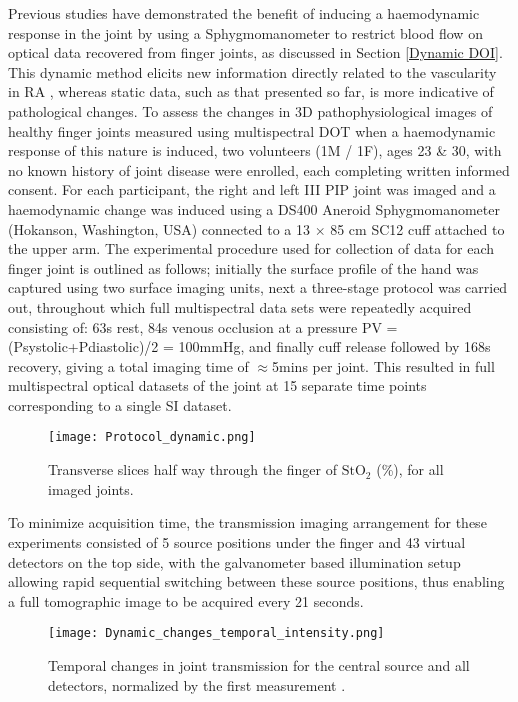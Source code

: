 \documentclass[twoside]{bhamthesis}
\theoremstyle{definition}
\begin{document}
Previous studies have demonstrated the benefit of inducing a haemodynamic response in the joint by using a Sphygmomanometer to restrict blood flow on optical data recovered from finger joints, as discussed in Section \ref{Dynamic DOI}. This dynamic method elicits new information directly related to the vascularity in RA \cite{lasker2007dynamic}, whereas static data, such as that presented so far, is more indicative of pathological changes. To assess the changes in 3D pathophysiological images of healthy finger joints measured using multispectral DOT when a haemodynamic response of this nature is induced, two volunteers (1M / 1F), ages 23 \& 30, with no known history of joint disease were enrolled, each completing written informed consent. For each participant, the right and left III PIP joint was imaged and a haemodynamic change was induced using a DS400 Aneroid Sphygmomanometer (Hokanson, Washington, USA) connected to a 13 $\times$ 85 cm SC12 cuff attached to the upper arm. The experimental procedure used for collection of data for each finger joint is outlined as follows; initially the surface profile of the hand was captured using two surface imaging units, next a three-stage protocol was carried out, throughout which full multispectral data sets were repeatedly acquired consisting of: 63s rest, 84s venous occlusion at a pressure PV = (Psystolic+Pdiastolic)/2 = 100mmHg, and finally cuff release followed by 168s recovery, giving a total imaging time of $\approx$5mins per joint. This resulted in full multispectral optical datasets of the joint at 15 separate time points corresponding to a single SI dataset.

\begin{figure}[!ht]
\centering\texttt{[image: Protocol\_dynamic.png]}
\caption{Transverse slices half way through the finger of $\mathrm{StO_2}$ (\%), for all imaged joints.}
\end{figure}

To minimize acquisition time, the transmission imaging arrangement for these experiments consisted of 5 source positions under the finger and 43 virtual detectors on the top side, with the galvanometer based illumination setup allowing rapid sequential switching between these source positions, thus enabling a full tomographic image to be acquired every 21 seconds. 

\begin{figure}[!ht]
\centering\texttt{[image: Dynamic\_changes\_temporal\_intensity.png]}
\caption{Temporal changes in joint transmission for the central source and all detectors, normalized by the first measurement
.}
\label{Dynamic_changes_temporal_intensity}
\end{figure}
\end{document}

